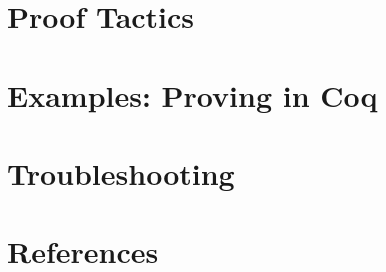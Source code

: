 \documentclass{article}
\begin{document}
\newpage
\section{Proof Tactics}
	\label{Sec: tactics}
	


\newpage
\section{Examples: Proving in Coq}
	\label{Sec: proof examples}
	



\newpage
\section{Troubleshooting}
	\label{Sec: troubleshooting}
	



\newpage
\section{References}
	\label{Sec: refs}
	
\end{document}
